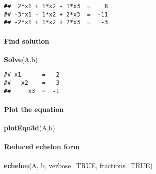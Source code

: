 \documentclass[
]{article}
\newenvironment{Shaded}{\begin{snugshade}}{\end{snugshade}}
\newcommand{\DataTypeTok}[1]{\textcolor[rgb]{0.13,0.29,0.53}{#1}}
\newcommand{\KeywordTok}[1]{\textcolor[rgb]{0.13,0.29,0.53}{\textbf{#1}}}
\newcommand{\NormalTok}[1]{#1}
\newcommand{\OtherTok}[1]{\textcolor[rgb]{0.56,0.35,0.01}{#1}}
\begin{document}
\begin{verbatim}
##  2*x1 + 1*x2 - 1*x3  =    8 
## -3*x1 - 1*x2 + 2*x3  =  -11 
## -2*x1 + 1*x2 + 2*x3  =   -3
\end{verbatim}

\hypertarget{find-solution}{%
\paragraph{Find solution}\label{find-solution}}

\begin{Shaded}
\begin{Highlighting}[]
\KeywordTok{Solve}\NormalTok{(A,b)}
\end{Highlighting}
\end{Shaded}

\begin{verbatim}
## x1      =   2 
##   x2    =   3 
##     x3  =  -1
\end{verbatim}

\hypertarget{plot-the-equation}{%
\paragraph{Plot the equation}\label{plot-the-equation}}

\begin{Shaded}
\begin{Highlighting}[]
\KeywordTok{plotEqn3d}\NormalTok{(A,b)}
\end{Highlighting}
\end{Shaded}

\hypertarget{reduced-echelon-form}{%
\paragraph{Reduced echelon form}\label{reduced-echelon-form}}

\begin{Shaded}
\begin{Highlighting}[]
\KeywordTok{echelon}\NormalTok{(A, b, }\DataTypeTok{verbose=}\OtherTok{TRUE}\NormalTok{, }\DataTypeTok{fractions=}\OtherTok{TRUE}\NormalTok{)}
\end{Highlighting}
\end{Shaded}
\end{document}
